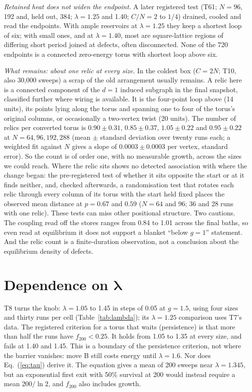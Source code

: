 \documentclass[aps,pre,10pt,twocolumn,superscriptaddress,nofootinbib]{revtex4-2}
\begin{document}
\emph{Retained heat does not widen the endpoint.} A later registered test (T61; $N=96$, 192 and,
held out, 384; $\lambda=1.25$ and 1.40; $C/N=2$ to $1/4$) drained, cooled and read the endpoints.
With ample reservoirs at $\lambda=1.25$ they keep a shortest loop of six; with small ones, and at
$\lambda=1.40$, most are square-lattice regions of differing short period joined at defects, often
disconnected. None of the 720 endpoints is a connected zero-energy torus with shortest loop above six.

\emph{What remains: about one relic at every size.} In the coldest box ($C=2N$; T10, also 30,000
sweeps) a scrap of the old arrangement usually remains. A relic here is a connected component of the $d=1$ induced subgraph in the final snapshot, classified further where
wiring is available. It is the four-point loop above (14 units), its points lying along the torus and
spanning one to four of the torus's original columns, or occasionally a two-vertex twist (20 units).
The number of relics per converted torus is $0.90\pm0.31$, $0.85\pm0.37$, $1.05\pm0.22$ and
$0.95\pm0.22$ at $N=64,96,192,288$ (mean $\pm$ standard deviation over twenty runs each; a weighted
fit against $N$ gives a slope of $0.0003\pm0.0003$ per vertex, standard error). So the count is of
order one, with no measurable growth, across the sizes we could reach. Where the relic sits shows no
detected association with where the change began: the pre-registered test of whether it sits opposite
the start or at it finds neither, and, checked afterwards, a randomisation test that rotates each
relic through every column of its torus with the start held fixed places the observed mean distance
at $p=0.67$ and $0.59$ ($N=64$ and 96; 36 and 28 runs with one relic). These tests can miss other
positional structure. Two cautions. The coupling read off the stores ranges from 0.84 to 1.01 across the
final baths, so even read at equilibrium it does not support a blanket ``below $g=1$''
statement. And the relic count is a finite-duration observation, not a conclusion about the
equilibrium density of defects.

\section{Dependence on \texorpdfstring{$\boldsymbol{\lambda}$}{lambda}}
\label{sec:lambda}

T8 turns the knob: $\lambda=1.05$ to 1.45 in steps of 0.05 at $g=1.5$, using four sizes and thirty
runs per cell (Table~\ref{tab:lambda}); its $\lambda=1.25$ comparison uses T7's data. The registered
criterion for a torus that waits (persistence) is that more than half the runs have $f_{200}<0.25$.
It holds from 1.05 to 1.35 at every size, and fails
at 1.40 and 1.45. This is a boundary of the persistence criterion, not where the barrier vanishes: move B
still costs energy until $\lambda=1.6$. Nor does Eq.~(\ref{eq:tau}) derive it. The equation gives a
mean of 200 sweeps near $\lambda=1.345$, but an exponential first exit with 50\% survival at 200 would
instead require a mean $200/\ln2$, and $f_{200}$ also includes growth.
\end{document}
